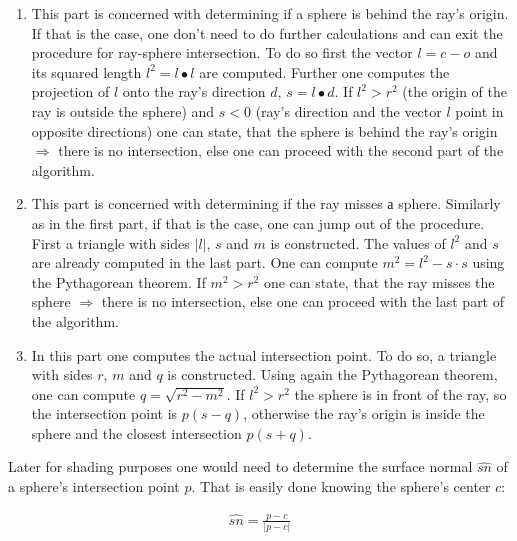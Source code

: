 \documentclass{article}
\begin{document}
\begin{enumerate}[1.]
\item This part is concerned with determining if a sphere is behind the ray's origin. If that is the case, one don't need to do further calculations and can exit the procedure for ray-sphere intersection. To do so first the vector $l = c - o$ and its squared length $l^2 = l \bullet l$ are computed. Further one computes the projection of $l$ onto the ray's direction $d$, $s = l \bullet d$. If $l^2 > r^2$ (the origin of the ray is outside the sphere) and $s < 0$ (ray's direction and the vector $l$ point in opposite directions) one can state, that the sphere is behind the ray's origin $\Rightarrow$ there is no intersection, else one can proceed with the second part of the algorithm.

\item This part is concerned with determining if the ray misses а sphere. Similarly as in the first part, if that is the case, one can jump out of the procedure. First a triangle with sides $\lvert l \rvert$, $s$ and $m$ is constructed. The values of $l^2$ and $s$ are already computed in the last part. One can compute $m^2 = l^2 - s \cdot s$ using the Pythagorean theorem. \cite{pythagor} If $m^2 > r^2$ one can state, that the ray misses the sphere $\Rightarrow$ there is no intersection, else one can proceed with the last part of the algorithm.
	
\item In this part one computes the actual intersection point. To do so, a triangle with sides $r$, $m$ and $q$ is constructed. Using again the Pythagorean theorem, one can compute $q = \sqrt{r^2 - m^2}$. If $l^2 > r^2$ the sphere is in front of the ray, so the intersection point is $p(s-q)$, otherwise the ray's origin is inside the sphere and the closest intersection $p(s+q)$.
\end{enumerate}

Later for shading purposes one would need to determine the surface normal $\hat{sn}$ of a sphere's intersection point $p$. That is easily done knowing the sphere's center $c$:

\begin{align}
	\hat{sn} = \frac{p - c}{\lvert p - c \rvert}
\end{align}


\end{document}
